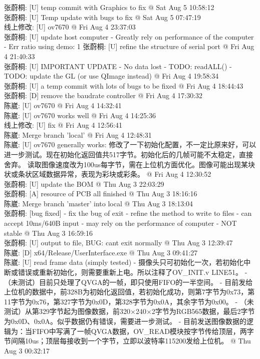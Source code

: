 \documentclass[a4paper]{paper}
\begin{document}
张蔚桐: [U] temp commit with Graphics to fix @ Sat Aug 5 10:58:12\\ 
张蔚桐: [U] Temp update with bugs to fix @ Sat Aug 5 07:47:19\\ 
线上修改: [U] ov7670 @ Fri Aug 4 23:37:03\\ 
张蔚桐: [U] update host computer     - Greatly rely on performance of the computer     - Err ratio using demo: 1%
张蔚桐: [U] refine the structure of serial port @ Fri Aug 4 21:40:33\\ 
张蔚桐: [U] IMPORTANT UPDATE     - No data lost     - TODO: readALL()     - TODO: update the GL (or use QImage instead) @ Fri Aug 4 19:58:34\\ 
张蔚桐: [U] a temp commit with lots of bugs to be fixed @ Fri Aug 4 18:44:43\\ 
张蔚桐: [D] remove the baudrate controller @ Fri Aug 4 17:30:32\\ 
陈崴: [U] ov7670 @ Fri Aug 4 14:32:41\\ 
陈崴: [U] ov7670 works well @ Fri Aug 4 14:25:36\\ 
线上修改: [U] fix @ Fri Aug 4 12:56:41\\  
陈崴: Merge branch 'local' @ Fri Aug 4 12:48:31\\ 
陈崴: [U] ov7670 generally works: 修改了一下初始化配置，不一定比原来好，可以进一步测试。现在初始化返回值共517字节。初始化后的几帧可能不太稳定，直接舍弃。 读取图像速度改为100us每字节，需在上位机方面优化。图像可能出现某块状或条状区域数据异常，表现为彩块或彩条。 @ Fri Aug 4 12:30:52\\ 
张蔚桐: [U] update the BOM @ Thu Aug 3 22:03:29\\ 
张蔚桐: [A] resource of PCB all finished @ Thu Aug 3 18:16:16\\ 
陈崴: Merge branch 'master' into local @ Thu Aug 3 18:13:04\\ 
张蔚桐: [bug fixed]     - fix the bug of exit     - refine the method to write to files     - can accept 10ms/640B input     - may rely on the performance of computer     - NOT stable @ Thu Aug 3 16:59:16\\ 
张蔚桐: [U] output to file, BUG: cant exit normally @ Thu Aug 3 12:39:47\\ 
陈崴: [D] x64/Release/UserInterface.exe @ Thu Aug 3 09:41:27\\ 
陈崴: [U] read frame data (simply tested) 	- 摄像头只可初始化一次，若初始化中断或错误或重新初始化，则需要重新上电。所以注释了OV\_INIT.v LINE51。 	- （未测试）目前只处理了QVGA的一帧，即只使用FIFO的一半空间。 	- 目前发给上位机的数据中，前328B为初始化返回值，若初始化成功，则第7字节为0x73，第11字节为0x76，第327字节为0x0D，第328字节为0x0A，其余字节为0x00。 	- （未测试）从第329字节起为图像数据，前320×240×2字节为RGB565数据，最后2字节为0x0D、0x0A。似乎数据仍有错误，需要进一步测试。 	- 目前发送图像数据的逻辑为：当FIFO中写满了一帧QVGA数据，OV\_READ模块按字节传给顶层，两字节间隔10us；顶层每接收到一个字节，立即以波特率115200发给上位机。 @ Thu Aug 3 00:32:17\\  
\end{document}

